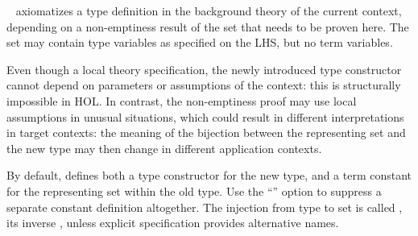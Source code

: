 \begin{isabellebody}
\begin{isamarkuptext}
\begin{description}
  \item \hyperlink{command.HOL.typedef}{\mbox{}}~
  axiomatizes a type definition in the background theory of the
  current context, depending on a non-emptiness result of the set
   that needs to be proven here.  The set  may
  contain type variables  as specified on the LHS,
  but no term variables.

  Even though a local theory specification, the newly introduced type
  constructor cannot depend on parameters or assumptions of the
  context: this is structurally impossible in HOL.  In contrast, the
  non-emptiness proof may use local assumptions in unusual situations,
  which could result in different interpretations in target contexts:
  the meaning of the bijection between the representing set 
  and the new type  may then change in different application
  contexts.

  By default, \hyperlink{command.HOL.typedef}{\mbox{}} defines both a type
  constructor  for the new type, and a term constant  for the representing set within the old type.  Use the ``'' option to suppress a separate constant definition
  altogether.  The injection from type to set is called ,
  its inverse , unless explicit \hyperlink{keyword.HOL.morphisms}{\mbox{}} specification provides alternative names.


\end{description}
\end{isamarkuptext}
\end{isabellebody}
